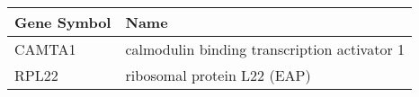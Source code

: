 \begin{tabular}{ll}
\toprule
Gene Symbol &                                         Name \\
\midrule
     CAMTA1 & calmodulin binding transcription activator 1 \\
      RPL22 &                  ribosomal protein L22 (EAP) \\
\bottomrule
\end{tabular}
